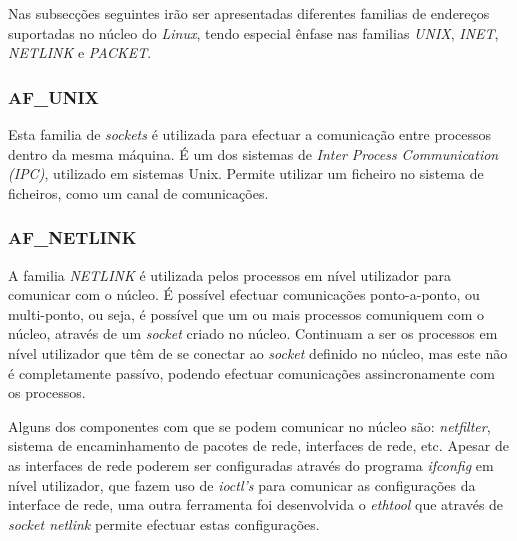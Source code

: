 Nas subsecções seguintes irão ser apresentadas diferentes familias de endereços suportadas no núcleo do \textit{Linux}, tendo especial ênfase nas familias \textit{UNIX}, \textit{INET}, \textit{NETLINK} e \textit{PACKET}.





\subsubsection{AF\_UNIX}

Esta familia de \textit{sockets} é utilizada para efectuar a comunicação entre processos dentro da mesma máquina.
É um dos sistemas de \textit{Inter Process Communication (IPC)}, utilizado em sistemas Unix.
Permite utilizar um ficheiro no sistema de ficheiros, como um canal de comunicações.

\subsubsection{AF\_NETLINK}

A familia \textit{NETLINK} é utilizada pelos processos em nível utilizador para comunicar com o núcleo.
É possível efectuar comunicações ponto-a-ponto, ou multi-ponto, ou seja, é possível que um ou mais processos comuniquem com o núcleo, através de um \textit{socket} criado no núcleo.
Continuam a ser os processos em nível utilizador que têm de se conectar ao \textit{socket} definido no núcleo, mas este não é completamente passívo, podendo efectuar comunicações assincronamente com os processos.

Alguns dos componentes com que se podem comunicar no núcleo são: \textit{netfilter}, sistema de encaminhamento de pacotes de rede, interfaces de rede, etc.
Apesar de as interfaces de rede poderem ser configuradas através do programa \textit{ifconfig} em nível utilizador, que fazem uso de \textit{ioctl's} para comunicar as configurações da interface de rede, uma outra ferramenta foi desenvolvida o \textit{ethtool} que através de \textit{socket netlink} permite efectuar estas configurações.



